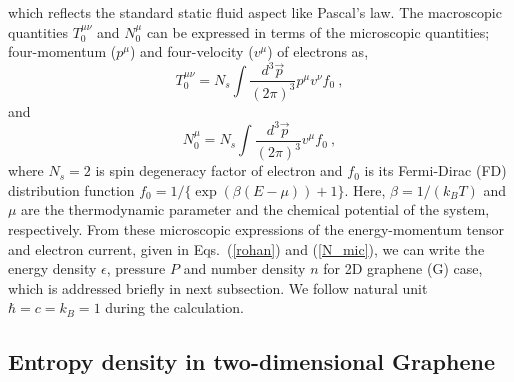 \documentclass[amsmath,amssymb,aps,prb]{revtex4-2}
\newcommand{\ep}{\epsilon}
\begin{document}
    which reflects  the standard static fluid aspect like Pascal's law. The macroscopic quantities $T_0^{\mu \nu}$ and $N^\mu_0$ can be expressed in terms of the microscopic quantities; four-momentum ($p^{\mu}$) and four-velocity ($v^{\mu}$) of electrons as,
    \begin{equation}
    T_0^{\mu\nu} = N_s\int \frac{d^3\vec{p}}{(2\pi)^3}p^\mu v^\nu f_0~,
    \label{rohan}
    \end{equation}
    and
    \begin{equation}
    N_0^{\mu} = N_s\int \frac{d^3\vec{p}}{(2\pi)^3} v^\mu f_0~,
    \label{N_mic}
    \end{equation}
    where $N_s=2$ is spin degeneracy factor of electron and $f_0$ is its Fermi-Dirac (FD) distribution function $f_0=1/\{\exp{(\beta(E-\mu))}+1\}$. Here, $\beta=1/(k_B T)$ and $\mu$ are the thermodynamic parameter and the chemical potential of the system, respectively. From these microscopic expressions of the energy-momentum tensor and electron current, given in Eqs.~(\ref{rohan}) and (\ref{N_mic}), we can write the energy density $\ep$, pressure $P$ and number density $n$ for 2D graphene (G) case, which is addressed briefly in next subsection. We follow natural unit $\hbar=c=k_B=1$ during the calculation.
%
    \subsection{Entropy density in two-dimensional Graphene}
\end{document}
